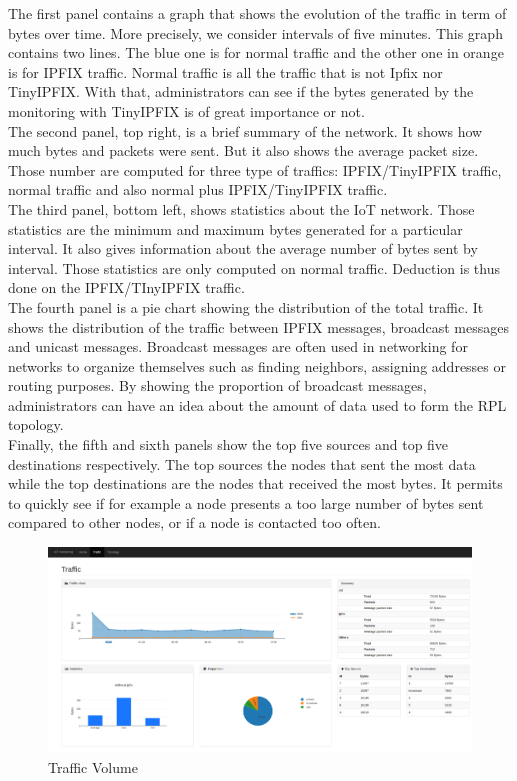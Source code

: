 The first panel contains a graph that shows the evolution of the traffic in term of bytes over time. More precisely, we consider intervals of five minutes. This graph contains two lines. The blue one is for normal traffic and the other one in orange is for IPFIX traffic. Normal traffic is all the traffic that is not Ipfix nor TinyIPFIX. With that, administrators can see if the bytes generated by the monitoring with TinyIPFIX is of great importance or not. \\

The second panel, top right, is a brief summary of the network. It shows how much bytes and packets were sent. But it also shows the average packet size. Those number are computed for three type of traffics: IPFIX/TinyIPFIX traffic, normal traffic and also normal plus IPFIX/TinyIPFIX traffic.\\

The third panel, bottom left, shows statistics about the IoT network. Those statistics are the minimum and maximum bytes generated for a particular interval. It also gives information about the average number of bytes sent by interval. Those statistics are only computed on normal traffic. Deduction is thus done on the IPFIX/TInyIPFIX traffic.\\

The fourth panel is a pie chart showing the distribution of the total traffic. It shows the distribution of the traffic between IPFIX messages, broadcast messages and unicast messages. Broadcast messages are often used in networking for networks to organize  themselves such as finding neighbors, assigning addresses or routing purposes. By showing the proportion of broadcast messages, administrators can have an idea about the amount of data used to form the RPL topology.\\

Finally, the fifth and sixth panels show the top five sources and top five destinations respectively. The top sources the nodes that sent the most data while the top destinations are the nodes that received the most bytes. It permits to quickly see if for example a node presents a too large number of bytes sent compared to other nodes, or if a node is contacted too often.

\begin{figure}
	\centering
	\includegraphics[width=\textwidth]{res/traffic.png}
	\caption{Traffic Volume}
	\label{fig:tool_traffic}
\end{figure}


